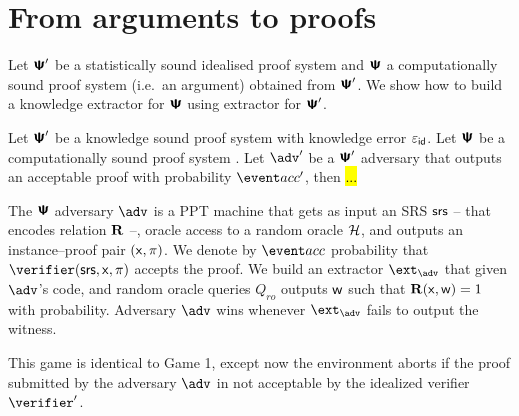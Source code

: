 
\section{From arguments to proofs}
\newcommand{\epsa}{\eps_{\mathsf{attema}}}
%
%
%
Let $\bm{\mathsf{\Psi}}'$ be a statistically sound idealised proof system and $\bm{\mathsf{\Psi}}$ a
computationally sound proof system (i.e.~an argument) obtained from $\bm{\mathsf{\Psi}}'$. We
show how to build a knowledge extractor for $\bm{\mathsf{\Psi}}$ using extractor for $\bm{\mathsf{\Psi}}'$.

\begin{lemma}
  Let $\bm{\mathsf{\Psi}}'$ be a knowledge sound proof system with knowledge error
  $\varepsilon_{\mathsf{id}}$. Let $\bm{\mathsf{\Psi}}$ be a computationally sound proof system . Let $\adv'$ be a $\bm{\mathsf{\Psi}}'$
  adversary that outputs an acceptable proof with probability $\accProb'$, then \hl{...}  
\end{lemma}


The $\bm{\mathsf{\Psi}}$ adversary $\adv$ is a PPT machine that gets as input an SRS $\mathsf{srs}$ --
that encodes relation $\mathbf{R}$ --, oracle access to a random oracle $\mathcal{H}$, and outputs an
instance--proof pair $(\mathsf{x}, \pi)$. We denote by $\accProb$ probability that
$\verifier (\srs, \inp, \zkproof)$ accepts the proof. We build an extractor $\ext_\adv$
that given $\adv$'s code, and random oracle queries $Q_{ro}$
outputs $\mathsf{w}$ such that $\mathbf{R}(\mathsf{x}, \mathsf{w}) = 1$ with 
probability.  Adversary $\adv$ wins whenever $\ext_\adv$ fails to output the witness.

This game is identical to Game 1, except now the environment aborts if the proof
submitted by the adversary $\adv$ in not acceptable by the idealized verifier
$\verifier'$.


